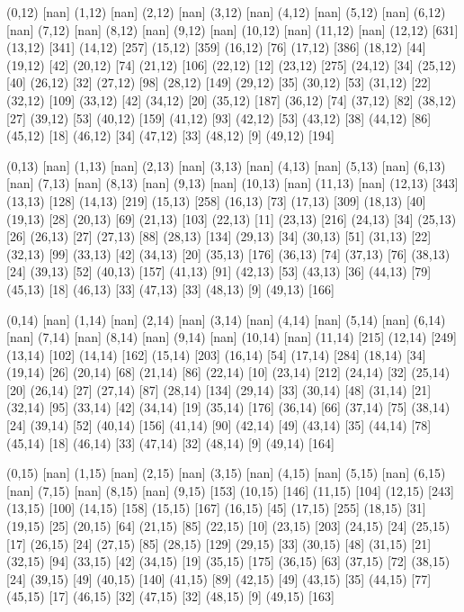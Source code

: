 {(0,12) [nan] (1,12) [nan] (2,12) [nan] (3,12) [nan] (4,12) [nan] (5,12) [nan] (6,12) [nan] (7,12) [nan] (8,12) [nan] (9,12) [nan] (10,12) [nan] (11,12) [nan] (12,12) [631] (13,12) [341] (14,12) [257] (15,12) [359] (16,12) [76] (17,12) [386] (18,12) [44] (19,12) [42] (20,12) [74] (21,12) [106] (22,12) [12] (23,12) [275] (24,12) [34] (25,12) [40] (26,12) [32] (27,12) [98] (28,12) [149] (29,12) [35] (30,12) [53] (31,12) [22] (32,12) [109] (33,12) [42] (34,12) [20] (35,12) [187] (36,12) [74] (37,12) [82] (38,12) [27] (39,12) [53] (40,12) [159] (41,12) [93] (42,12) [53] (43,12) [38] (44,12) [86] (45,12) [18] (46,12) [34] (47,12) [33] (48,12) [9] (49,12) [194] 

(0,13) [nan] (1,13) [nan] (2,13) [nan] (3,13) [nan] (4,13) [nan] (5,13) [nan] (6,13) [nan] (7,13) [nan] (8,13) [nan] (9,13) [nan] (10,13) [nan] (11,13) [nan] (12,13) [343] (13,13) [128] (14,13) [219] (15,13) [258] (16,13) [73] (17,13) [309] (18,13) [40] (19,13) [28] (20,13) [69] (21,13) [103] (22,13) [11] (23,13) [216] (24,13) [34] (25,13) [26] (26,13) [27] (27,13) [88] (28,13) [134] (29,13) [34] (30,13) [51] (31,13) [22] (32,13) [99] (33,13) [42] (34,13) [20] (35,13) [176] (36,13) [74] (37,13) [76] (38,13) [24] (39,13) [52] (40,13) [157] (41,13) [91] (42,13) [53] (43,13) [36] (44,13) [79] (45,13) [18] (46,13) [33] (47,13) [33] (48,13) [9] (49,13) [166] 

(0,14) [nan] (1,14) [nan] (2,14) [nan] (3,14) [nan] (4,14) [nan] (5,14) [nan] (6,14) [nan] (7,14) [nan] (8,14) [nan] (9,14) [nan] (10,14) [nan] (11,14) [215] (12,14) [249] (13,14) [102] (14,14) [162] (15,14) [203] (16,14) [54] (17,14) [284] (18,14) [34] (19,14) [26] (20,14) [68] (21,14) [86] (22,14) [10] (23,14) [212] (24,14) [32] (25,14) [20] (26,14) [27] (27,14) [87] (28,14) [134] (29,14) [33] (30,14) [48] (31,14) [21] (32,14) [95] (33,14) [42] (34,14) [19] (35,14) [176] (36,14) [66] (37,14) [75] (38,14) [24] (39,14) [52] (40,14) [156] (41,14) [90] (42,14) [49] (43,14) [35] (44,14) [78] (45,14) [18] (46,14) [33] (47,14) [32] (48,14) [9] (49,14) [164] 

(0,15) [nan] (1,15) [nan] (2,15) [nan] (3,15) [nan] (4,15) [nan] (5,15) [nan] (6,15) [nan] (7,15) [nan] (8,15) [nan] (9,15) [153] (10,15) [146] (11,15) [104] (12,15) [243] (13,15) [100] (14,15) [158] (15,15) [167] (16,15) [45] (17,15) [255] (18,15) [31] (19,15) [25] (20,15) [64] (21,15) [85] (22,15) [10] (23,15) [203] (24,15) [24] (25,15) [17] (26,15) [24] (27,15) [85] (28,15) [129] (29,15) [33] (30,15) [48] (31,15) [21] (32,15) [94] (33,15) [42] (34,15) [19] (35,15) [175] (36,15) [63] (37,15) [72] (38,15) [24] (39,15) [49] (40,15) [140] (41,15) [89] (42,15) [49] (43,15) [35] (44,15) [77] (45,15) [17] (46,15) [32] (47,15) [32] (48,15) [9] (49,15) [163] 

}
